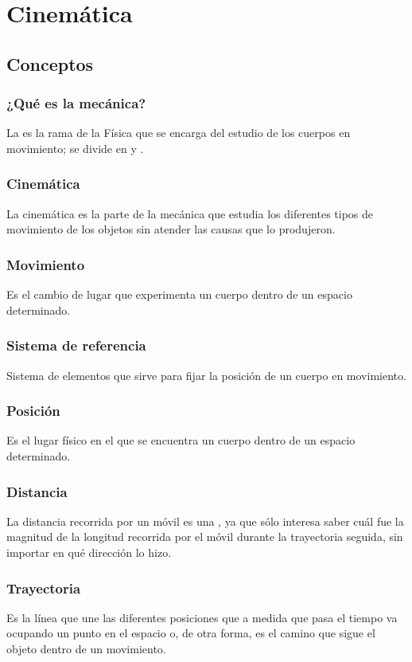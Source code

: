 \documentclass[14pt]{beamer}
\begin{document}
\section{Cinemática}
\subsection{Conceptos}

\begin{frame}
\frametitle{¿Qué es la mecánica?}
La  es la rama de la Física que se encarga del estudio de los cuerpos en movimiento; \pause se divide en \pause {} \pause y .
\end{frame}
\begin{frame}
\frametitle{Cinemática}
La cinemática es la parte de la mecánica que estudia los diferentes tipos de movimiento de los objetos sin atender las causas que lo produjeron.
\end{frame}
\begin{frame}
\frametitle{Movimiento}
Es el cambio de lugar que experimenta un cuerpo dentro de un espacio determinado.
\end{frame}
\begin{frame}
\frametitle{Sistema de referencia}
Sistema de elementos que sirve para fijar la posición de un cuerpo en movimiento.
\end{frame}
\begin{frame}
\frametitle{Posición}
Es el lugar físico en el que se encuentra un cuerpo dentro de un espacio determinado.
\end{frame}
\begin{frame}
\frametitle{Distancia}
La distancia recorrida por un móvil es una , \pause ya que sólo interesa saber cuál fue la magnitud de la longitud recorrida por el móvil durante la trayectoria seguida, sin importar en qué dirección lo hizo.
\end{frame}
\begin{frame}
\frametitle{Trayectoria}
Es la línea que une las diferentes posiciones que a medida que pasa el tiempo va ocupando un punto en el espacio o, de otra forma, es el camino que sigue el objeto dentro de un movimiento.
\end{frame}
\end{document}
